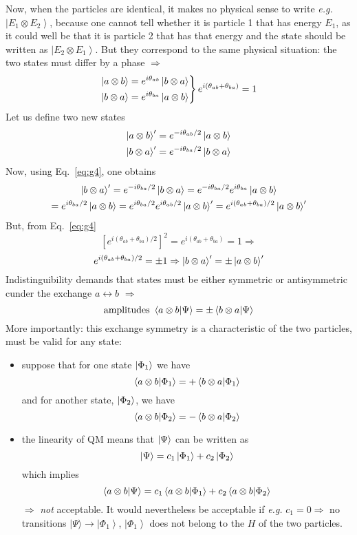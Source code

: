 \documentclass[12pt]{article}
\newcommand{\be}{\begin{equation}}
\newcommand{\ee}{\end{equation}}
\begin{document}
Now, when the particles are identical, it makes no physical
sense to write \textit{e.g.} $\left|E_{1} \otimes E_{2}\right\rangle$, because one cannot tell
whether it is particle 1 that has energy $E_{1}$, as it could
well be that it is particle 2 that has that energy and
the state should be written as $\left|E_{2} \otimes E_{1}\right\rangle$. But they
correspond to the same physical situation: the two states
must differ by a phase $\Rightarrow$
\be
\left.
\begin{aligned}
\ket{a\otimes b} &= e^{i\theta_{ab}}\ket{b \otimes a}\\
\ket{b\otimes a} &= e^{i\theta_{ba}}\ket{a \otimes b}
\end{aligned}
\right\}
e^{i(\theta_{ab} + \theta_{ba})}=1
\label{eq:g4}
\ee
Let us define two new states
\be
\begin{aligned}
\ket{a\otimes b}^\prime &= e^{-i\theta_{ab}/2}\ket{a \otimes b}\\
\ket{b\otimes a}^\prime &= e^{-i\theta_{ba}/2}\ket{b \otimes a}
\end{aligned}
\ee
Now, using Eq.~\eqref{eq:g4}, one obtains
\be
\begin{gathered}
\ket{b\otimes a}^\prime = e^{-i\theta_{ba}/2}\ket{b \otimes a} =  e^{-i\theta_{ba}/2} e^{i\theta_{ba}} \ket{a\otimes b}\\
= e^{i\theta_{ba}/2} \ket{a \otimes b} = e^{i\theta_{ba}/2}  e^{i\theta_{ab}/2} \ket{a\otimes b}^\prime 
= e^{i\left(\theta_{a b}+\theta_{b a}\right) / 2} \ket{a\otimes b}^\prime 
\end{gathered}
\ee
But, from Eq.~\eqref{eq:g4}
\[
\left[
e^{i(\theta_{ab}+\theta_{ba})/2}
\right]^2 = e^{i(\theta_{ab}+\theta_{ba})} = 1 \Rightarrow
\]
\be
e^{i(\theta_{ab}+\theta_{ba})/2} = \pm 1 \Rightarrow
\ket{b\otimes a}^\prime = \pm \ket{a\otimes b}^\prime
\ee
Indistinguibility demands that states must be
either symmetric or antisymmetric cunder
the exchange $a \leftrightarrow b$ $\Rightarrow$
\be
\text{amplitudes } \bra{a\otimes b}\ket{\Psi} = \pm \bra{b\otimes a}\ket{\Psi}
\ee
More importantly: this exchange symmetry is a
characteristic of the two particles, must be valid
for any state:
\begin{itemize}
\item suppose that for one state $\ket{\Phi_1}$ we have
\be
\bra{a\otimes b}\ket{\Phi_1} = + \bra{b\otimes a}\ket{\Phi_1}
\label{eq:g9}
\ee
and for another state, $\ket{\Phi_2}$, we have
\be
\bra{a\otimes b}\ket{\Phi_2} = - \bra{b\otimes a}\ket{\Phi_2}
\label{eq:g10}
\ee
\item the linearity of QM means that $\ket{\Psi}$ can be
written as
\be
\ket{\Psi} = c_1 \ket{\Phi_1} + c_2 \ket{\Phi_2} 
\ee
which implies
\be
\bra{a\otimes b}\ket{\Psi} = c_1 \bra{a\otimes b}\ket{\Phi_1} + c_2 \bra{a\otimes b}\ket{\Phi_2} 
\ee
$\Rightarrow$ \emph{not} acceptable.
It would nevertheless be acceptable if \textit{e.g.}
$c_{1}=0 \Rightarrow$ no transitions $|\Psi\rangle \rightarrow\left|\Phi_{1}\right\rangle$,
$\left|\Phi_{1}\right\rangle$ does not belong to the $H$ of the two particles.
\end{itemize}
\end{document}
